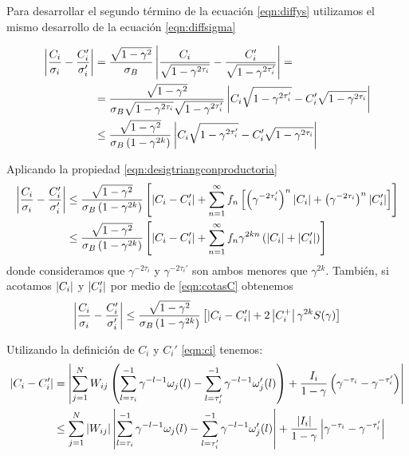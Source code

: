Para desarrollar el segundo término de la ecuación \eqref{eqn:diffys} utilizamos el mismo desarrollo de la ecuación \eqref{eqn:diffsigma}

\begin{align}
\nonumber  \left|\frac{C_i}{\sigma_i} - \frac{C_i'}{\sigma_i'}\right| &=
    \frac{\sqrt{1-\gamma^2}}{\sigma_B}
    \left| \frac{C_i}{\sqrt{1-\gamma^{2\tau_i}}} - \frac{C_i'}{\sqrt{1-\gamma^{2\tau'_i}}} \right|=\\
\nonumber   &=\frac{\sqrt{1-\gamma^2}}{\sigma_B \sqrt{1-\gamma^{2\tau_i}}
    \sqrt{1-\gamma^{2\tau'_i}} }
    \left| C_i\sqrt{1-\gamma^{2\tau'_i}} - C_i'\sqrt{1-\gamma^{2\tau_i} }\right| \\
    & \leq  \frac{\sqrt{1-\gamma^2}}{\sigma_B \left(1-\gamma^{2k}\right)}
    \left| C_i\sqrt{1-\gamma^{2\tau'_i}} - C_i'\sqrt{1-\gamma^{2\tau_i} }\right|
\end{align}


Aplicando la propiedad \eqref{eqn:desigtriangconproductoria} 
\begin{align*}
    \left|\frac{C_i}{\sigma_i} - \frac{C_i'}{\sigma_i'}\right|
    & \leq  \frac{\sqrt{1-\gamma^2}}{\sigma_B \left(1-\gamma^{2k}\right)} 
    \left[ \left| C_i - C_i' \right| + \sum_{n=1}^{\infty} f_n \left[ \left( \gamma^{-2\tau_i'}\right)^n\left|C_i\right| + 
    \left( \gamma^{-2\tau_i}\right)^n\left|C_i'\right| \right] \right] \\
    &\leq \frac{\sqrt{1-\gamma^2}}{\sigma_B \left(1-\gamma^{2k}\right)} 
    \left[ \left| C_i - C_i' \right| + \sum_{n=1}^{\infty} f_n \gamma^{2kn} \left( \left|C_i\right| + \left|C_i'\right| \right) \right]
    \end{align*}
donde consideramos que $\gamma^{-2\tau_i}$ y $\gamma^{-2\tau_i'}$ son ambos menores que $\gamma^{2k}$. También, si acotamos $\left|C_i\right|$ y $\left|C_i'\right|$ por medio de \eqref{eqn:cotasC} obtenemos
\begin{equation}
    \left|\frac{C_i}{\sigma_i} - \frac{C_i'}{\sigma_i'}\right|
     \leq \frac{\sqrt{1-\gamma^2}}{\sigma_B \left(1-\gamma^{2k}\right)} 
    \left[ \left| C_i - C_i' \right| + 2 \left|C_i^+\right| \gamma^{2k} S(\gamma) \right] 
    \label{eqn:diffcispond}
\end{equation}

Utilizando la definición de $C_i$ y $C_i'$ \eqref{eqn:ci} tenemos:
\begin{align}
\nonumber \left| C_i - C_i' \right| &= 
\left| \sum_{j=1}^N W_{ij} \left( \sum_{l=\tau_i}^{-1}\gamma^{-l-1} \omega_j(l) -\sum_{l=\tau_i'}^{-1} \gamma^{-l-1} \omega_j'(l) \right) + \frac{I_i}{1-\gamma} \left(\gamma^{-\tau_i} - \gamma^{-\tau_i'} \right) \right|\\
&\leq \sum_{j=1}^N \left|W_{ij}\right| \left| \sum_{l=\tau_i}^{-1}\gamma^{-l-1} \omega_j(l) -\sum_{l=\tau_i'}^{-1} \gamma^{-l-1} \omega_j'(l) \right| + \frac{\left|I_i\right|}{1-\gamma} \left|\gamma^{-\tau_i} - \gamma^{-\tau_i'} \right|
\label{eqn:diffcis}
\end{align}

